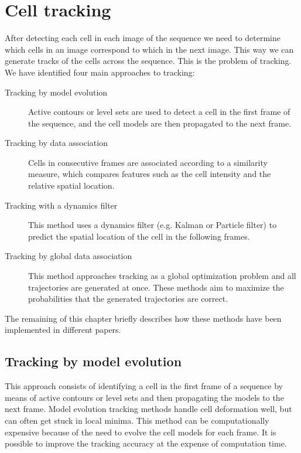 \section{Cell tracking \statusfirstdraft}
\label{sec:tracking}

After detecting each cell in each image of the sequence we need to determine which cells in an image correspond to which in the next image. This way we can generate tracks of the cells across the sequence. This is the problem of tracking. We have identified four main approaches to tracking:

\begin{description}
	\item [Tracking by model evolution] Active contours or level sets are used to detect a cell in the first frame of the sequence, and the cell models are then propagated to the next frame.
	\item [Tracking by data association] Cells in consecutive frames are associated according to a similarity measure, which compares features such as the cell intensity and the relative spatial location.
	\item [Tracking with a dynamics filter] This method uses a dynamics filter (e.g. Kalman or Particle filter) to predict the spatial location of the cell in the following frames.
	\item [Tracking by global data association] This method approaches tracking as a global optimization problem and all trajectories are generated at once. These methods aim to maximize the probabilities that the generated trajectories are correct.
\end{description}

The remaining of this chapter briefly describes how these methods have been implemented in different papers.

\subsection{Tracking by model evolution \statusfirstdraft}

This approach consists of identifying a cell in the first frame of a sequence by means of active contours or level sets and then propagating the models to the next frame. Model evolution tracking methods handle cell deformation well, but can often get stuck in local minima. This method can be computationally expensive because of the need to evolve the cell models for each frame. It is possible to improve the tracking accuracy at the expense of computation time.

